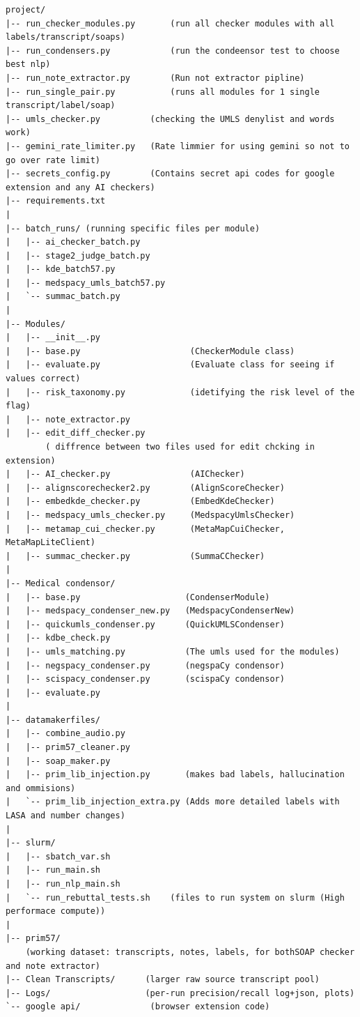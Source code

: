 \documentclass[11pt,a4paper]{article}
\begin{document}
\begin{verbatim}
project/
|-- run_checker_modules.py       (run all checker modules with all labels/transcript/soaps)
|-- run_condensers.py            (run the condeensor test to choose best nlp)
|-- run_note_extractor.py        (Run not extractor pipline)
|-- run_single_pair.py           (runs all modules for 1 single transcript/label/soap)              
|-- umls_checker.py          (checking the UMLS denylist and words work)
|-- gemini_rate_limiter.py   (Rate limmier for using gemini so not to go over rate limit)
|-- secrets_config.py        (Contains secret api codes for google extension and any AI checkers)
|-- requirements.txt
|
|-- batch_runs/ (running specific files per module)
|   |-- ai_checker_batch.py
|   |-- stage2_judge_batch.py     
|   |-- kde_batch57.py
|   |-- medspacy_umls_batch57.py
|   `-- summac_batch.py
|
|-- Modules/
|   |-- __init__.py
|   |-- base.py                      (CheckerModule class)
|   |-- evaluate.py                  (Evaluate class for seeing if values correct)
|   |-- risk_taxonomy.py             (idetifying the risk level of the flag)
|   |-- note_extractor.py
|   |-- edit_diff_checker.py        
        ( diffrence between two files used for edit chcking in extension)
|   |-- AI_checker.py                (AIChecker)
|   |-- alignscorechecker2.py        (AlignScoreChecker)
|   |-- embedkde_checker.py          (EmbedKdeChecker)
|   |-- medspacy_umls_checker.py     (MedspacyUmlsChecker)
|   |-- metamap_cui_checker.py       (MetaMapCuiChecker, MetaMapLiteClient)
|   |-- summac_checker.py            (SummaCChecker)
|
|-- Medical condensor/
|   |-- base.py                     (CondenserModule)
|   |-- medspacy_condenser_new.py   (MedspacyCondenserNew)
|   |-- quickumls_condenser.py      (QuickUMLSCondenser)
|   |-- kdbe_check.py
|   |-- umls_matching.py            (The umls used for the modules)
|   |-- negspacy_condenser.py       (negspaCy condensor)
|   |-- scispacy_condenser.py       (scispaCy condensor)
|   |-- evaluate.py 
|
|-- datamakerfiles/
|   |-- combine_audio.py
|   |-- prim57_cleaner.py
|   |-- soap_maker.py
|   |-- prim_lib_injection.py       (makes bad labels, hallucination and ommisions)
|   `-- prim_lib_injection_extra.py (Adds more detailed labels with LASA and number changes)
|
|-- slurm/
|   |-- sbatch_var.sh
|   |-- run_main.sh
|   |-- run_nlp_main.sh
|   `-- run_rebuttal_tests.sh    (files to run system on slurm (High performace compute))
|
|-- prim57/ 
    (working dataset: transcripts, notes, labels, for bothSOAP checker and note extractor)
|-- Clean Transcripts/      (larger raw source transcript pool)
|-- Logs/                   (per-run precision/recall log+json, plots)
`-- google api/              (browser extension code)
\end{verbatim}
\end{document}
